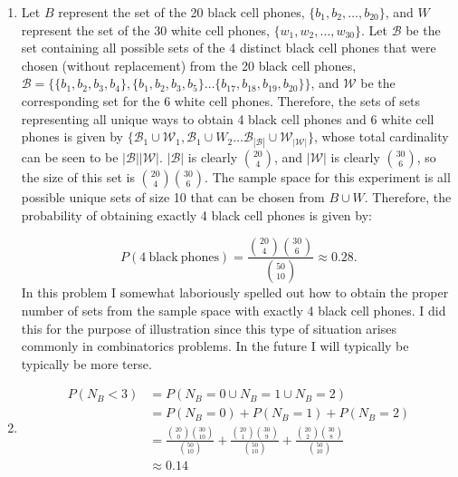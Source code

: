 \begin{problem}{3} $ $

	\begin{enumerate}

		\item 
			Let $B$ represent the set of the 20 black cell phones, $\{b_1, b_2, \ldots, b_{20} \}$, and $W$ represent the set of the 30 white cell phones, $ \{w_1, w_2, \ldots, w_{30} \}$.  Let $\mathcal B$ be the set containing all possible sets of the 4 distinct black cell phones that were chosen (without replacement) from the 20 black cell phones, $\mathcal B = \{ \{b_1, b_2, b_3, b_4\}, \{b_1, b_2, b_3, b_5\} \ldots \{b_{17}, b_{18}, b_{19}, b_{20}\}  \}$, and $\mathcal W$ be the corresponding set for the 6 white cell phones.  Therefore, the sets of sets representing all unique ways to obtain 4 black cell phones and 6 white cell phones is given by $\{ \mathcal B_1\cup \mathcal W_1,  \mathcal B_1\cup W_2\ldots \mathcal B_{|\mathcal B|} \cup \mathcal W_{|\mathcal W|} \}$, whose total cardinality can be seen to be $ |\mathcal B|  |\mathcal W|$.  $ |\mathcal B|$ is clearly $\binom{20}{4}$, and $|\mathcal W|$ is clearly $\binom{30}{6}$, so the size of this set is $\binom{20}{4}\binom{30}{6}$.  The sample space for this experiment is all possible unique sets of size 10 that can be chosen from $B \cup W$.  Therefore, the probability of obtaining exactly 4 black cell phones is given by:
			
			\begin{equation}
				P(4~\mathrm{black~phones}) = \frac{\binom{20}{4} \binom{30}{6}} {\binom{50}{10}} \approx 0.28.
			\end{equation}
In this problem I somewhat laboriously spelled out how to obtain the proper number of sets from the sample space with exactly 4 black cell phones.  I did this for the purpose of illustration since this type of situation arises commonly in combinatorics problems.  In the future I will typically be typically be more terse.
		
	\item 
		\begin{align*}
			P(N_B<3) &= P(N_B=0 \cup N_B=1 \cup N_B=2) \\
			& =P(N_B=0) + P(N_B=1)+ P(N_B=2) \\
			& = \frac{\binom{20}{0} \binom{30}{10}} {\binom{50}{10}}+\frac{\binom{20}{1} \binom{30}{9}} {\binom{50}{10}}+\frac{\binom{20}{2} \binom{30}{8}} {\binom{50}{10}} \\
			& \approx 0.14
		\end{align*}
			

	\end{enumerate}

\end{problem}

